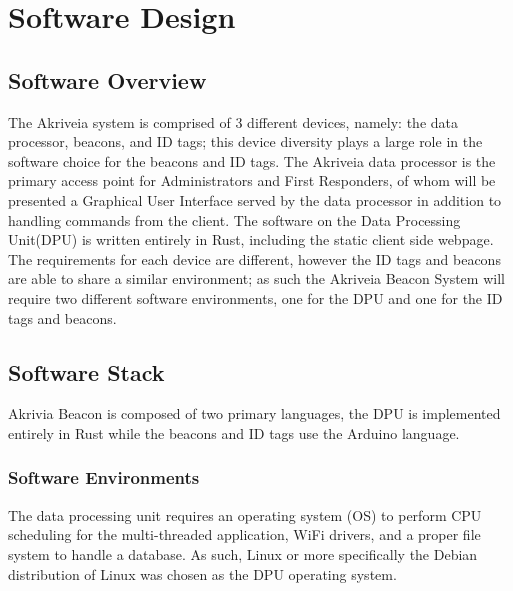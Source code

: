 

\setcounter{section}{5}
\section{Software Design}
\bigskip


\subsection{Software Overview}
\medskip
The Akriveia system is comprised of 3 different devices, namely: the data processor, beacons, and ID tags; this device diversity plays a large role in the software choice for the beacons and ID tags.
The Akriveia data processor is the primary access point for Administrators and First Responders, of whom will be presented a Graphical User Interface served by the data processor in addition to handling commands from the client.
The software on the Data Processing Unit(DPU) is written entirely in Rust, including the static client side webpage.
The requirements for each device are different, however the ID tags and beacons are able to share a similar environment; as such the Akriveia Beacon System will require two different software environments, one for the DPU and one for the ID tags and beacons.

\medskip
\subsection{Software Stack}
\medskip
Akrivia Beacon is composed of two primary languages, the DPU is implemented entirely in Rust while the beacons and ID tags use the Arduino language.

\medskip
\subsubsection{Software Environments}
\medskip
The data processing unit requires an operating system (\Gls{OS}) to perform CPU scheduling for the multi-threaded application, WiFi drivers, and a proper file system to handle a database.
As such, Linux or more specifically the \Gls{Debian} distribution of Linux was chosen as the DPU operating system.

